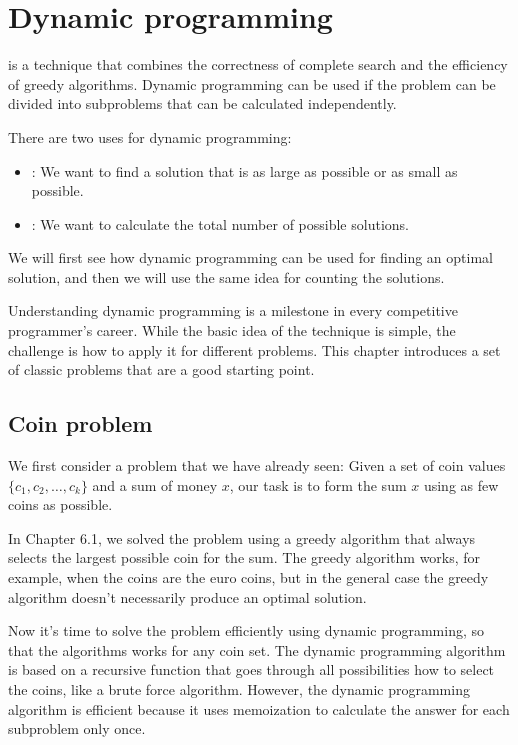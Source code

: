 \chapter{Dynamic programming}


is a technique that combines the correctness
of complete search and the efficiency
of greedy algorithms.
Dynamic programming can be used if the
problem can be divided into subproblems
that can be calculated independently.

There are two uses for dynamic programming:

\begin{itemize}
\item
{}:
We want to find a solution that is
as large as possible or as small as possible.
\item
{}:
We want to calculate the total number of
possible solutions.
\end{itemize}

We will first see how dynamic programming can
be used for finding an optimal solution,
and then we will use the same idea for
counting the solutions.

Understanding dynamic programming is a milestone
in every competitive programmer's career.
While the basic idea of the technique is simple,
the challenge is how to apply it for different problems.
This chapter introduces a set of classic problems
that are a good starting point.

\section{Coin problem}

We first consider a problem that we
have already seen:
Given a set of coin values $\{c_1,c_2,\ldots,c_k\}$
and a sum of money $x$, our task is to
form the sum $x$ using as few coins as possible.

In Chapter 6.1, we solved the problem using a
greedy algorithm that always selects the largest
possible coin for the sum.
The greedy algorithm works, for example,
when the coins are the euro coins,
but in the general case the greedy algorithm
doesn't necessarily produce an optimal solution.

Now it's time to solve the problem efficiently
using dynamic programming, so that the algorithms
works for any coin set.
The dynamic programming
algorithm is based on a recursive function
that goes through all possibilities how to
select the coins, like a brute force algorithm.
However, the dynamic programming
algorithm is efficient because
it uses memoization to
calculate the answer for each subproblem only once.

